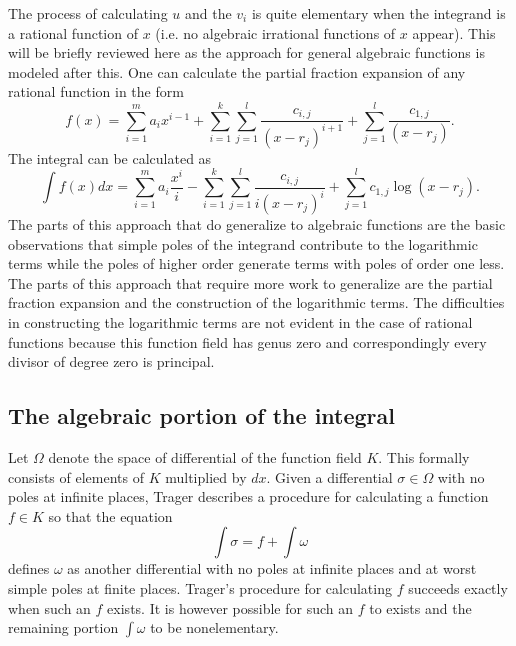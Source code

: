 \documentclass[12pt,reqno]{amsart}
\numberwithin{equation}{section}
\begin{document}
The process of calculating $u$ and the $v_i$ is quite elementary when the integrand is a rational function of $x$ (i.e. no algebraic irrational functions of $x$ appear). This will be briefly reviewed here as the approach for general algebraic functions is modeled after this. One can calculate the partial fraction expansion of any rational function in the form
\begin{equation}
\label{equ_pfrac}
 f(x) = \sum_{i=1}^{m} a_i x^{i-1} + \sum_{i=1}^{k} \sum_{j=1}^{l} \frac{c_{i,j}}{(x-r_j)^{i+1}} + \sum_{j=1}^{l} \frac{c_{1,j}}{(x-r_j)}\text{.}
\end{equation}
The integral can be calculated as
\begin{equation*}
 \int f(x) dx = \sum_{i=1}^{m} a_i \frac{x^{i}}{i} - \sum_{i=1}^{k} \sum_{j=1}^{l} \frac{c_{i,j}}{i(x-r_j)^i} + \sum_{j=1}^{l} c_{1,j} \log (x-r_j)\text{.}
\end{equation*}
The parts of this approach that do generalize to algebraic functions are the basic observations that simple poles of the integrand contribute to the logarithmic terms while the poles of higher order generate terms with poles of order one less. The parts of this approach that require more work to generalize are the partial fraction expansion and the construction of the logarithmic terms. The difficulties in constructing the logarithmic terms are not evident in the case of rational functions because this function field has genus zero and correspondingly every divisor of degree zero is principal. 


\subsection{The algebraic portion of the integral}
Let $\Omega$ denote the space of differential of the function field $K$. This formally consists of elements of $K$ multiplied by $dx$. Given a differential $ \sigma \in \Omega$ with no poles at infinite places, Trager describes a procedure for calculating a function $f \in K$ so that the equation
\begin{equation*}
 \int \sigma  = f + \int \omega
\end{equation*}
defines $\omega$ as another differential with no poles at infinite places and at worst simple poles at finite places. Trager's procedure for calculating $f$ succeeds exactly when such an $f$ exists. It is however possible for such an $f$ to exists and the remaining portion $\int \omega$ to be nonelementary.
\end{document}
